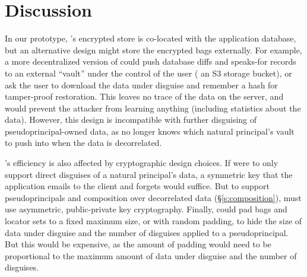 \section{Discussion}
\label{s:disc}

%
In our prototype, \sys's encrypted store is co-located with the application
database, but an alternative design might store the encrypted bags externally.
%
For example, a more decentralized version of \sys could push database diffs and
speaks-for records to an external ``vault'' under the control of the user (\eg
an S3 storage bucket), or ask the user to download the data under disguise
and remember a hash for tamper-proof restoration.
%
This leaves no trace of the data on the server, and would prevent the attacker
from learning anything (including statistics about the data).
%
However, this design is incompatible with further disguising of
pseudoprincipal-owned data, as \sys no longer knows which natural principal's
vault to push into when the data is decorrelated.
%

%
\sys's efficiency is also affected by cryptographic design choices.
%
If \sys were to only support direct disguises of a natural principal's data, a
symmetric key that the application emails to the client and forgets would
suffice.
%
But to support pseudoprincipals and composition over decorrelated data
(\S\ref{s:composition}), \sys must use asymmetric, public-private key
cryptography.
%
Finally, \sys could pad bags and locator sets to a fixed maximum size, or with
random padding, to hide the size of data under disguise and the number of
disguises applied to a pseudoprincipal.
%
But this would be expensive, as the amount of padding would need to be
proportional to the maximum amount of data under disguise and the number of
disguises.
%
